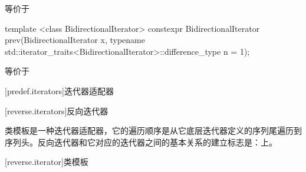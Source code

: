 \begin{itemdescr}
\pnum
\effects
等价于
\end{itemdescr}

%
\begin{itemdecl}
template <class BidirectionalIterator>
  constexpr BidirectionalIterator prev(BidirectionalIterator x,
    typename std::iterator_traits<BidirectionalIterator>::difference_type n = 1);
\end{itemdecl}

\begin{itemdescr}
\pnum
\effects
等价于
\end{itemdescr}

[predef.iterators]{迭代器适配器}

[reverse.iterators]{反向迭代器}

\pnum
类模板是一种迭代器适配器，它的遍历顺序是从它底层迭代器定义的序列尾遍历到序列头。反向迭代器和它对应的迭代器之间的基本关系的建立标志是：上。

[reverse.iterator]{类模板}

